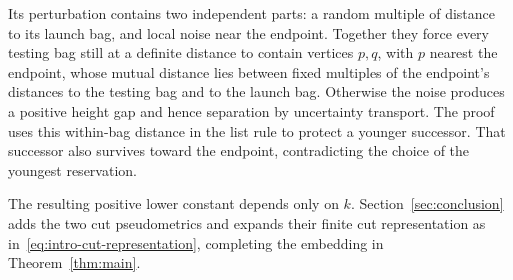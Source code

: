 Its perturbation contains two independent parts: a random multiple
of distance to its launch bag, and local noise near the endpoint.
Together they force every testing bag still at a definite distance
to contain vertices $p,q$, with $p$ nearest the endpoint, whose
mutual distance lies between fixed multiples of the endpoint's
distances to the testing bag and to the launch bag. Otherwise the
noise produces a positive height gap and hence separation by
uncertainty transport. The proof uses this within-bag distance in
the list rule to protect a younger successor. That successor also
survives toward the endpoint, contradicting the choice of the
youngest reservation.

The resulting positive lower constant depends only on $k$.
Section~\ref{sec:conclusion} adds the two cut pseudometrics and expands their
finite cut representation as in~\eqref{eq:intro-cut-representation},
completing the embedding in Theorem~\ref{thm:main}.
